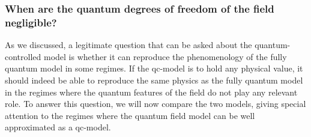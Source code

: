 \documentclass[letterpaper,12pt,titlepage,oneside,final]{book}
\newcommand{\tc}[1]{\textsc{#1}}
\begin{document}


\subsubsection*{When are the quantum degrees of freedom of the field negligible?}

As we discussed, a legitimate question that can be asked about the quantum-controlled model is whether it can reproduce the phenomenology of the fully quantum model in some regimes. If the qc-model is to hold any physical value, it should indeed be able to reproduce the same physics as the fully quantum model in the regimes where the quantum features of the field do not play any relevant role. To answer this question, we will now compare the two models, giving special attention to the regimes where the quantum field model can be well approximated as a qc-model. 
\end{document}
